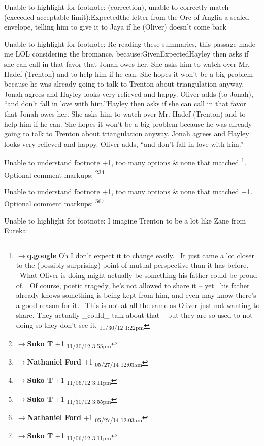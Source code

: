 	Unable to highlight for footnote: (correction), unable to correctly match (exceeded acceptable limit):Expectedthe letter from the Orc of Anglia  a sealed envelope, telling him to give it to Jaya if he (Oliver) doesn’t come back

	Unable to highlight for footnote: Re-reading these summaries, this passage made me LOL considering the bromance. because:GivenExpectedHayley then asks if she can call in that favor that Jonah owes her.  She asks him to watch over Mr. Hadef (Trenton) and to help him if he can.  She hopes it won’t be a big problem because he was already going to talk to Trenton about triangulation anyway.  Jonah agrees and Hayley looks very relieved and happy.  Oliver adds (to Jonah), “and don’t fall in love with him.”Hayley then asks if she can call in that favor that Jonah owes her.  She asks him to watch over Mr. Hadef (Trenton) and to help him if he can.  She hopes it won’t be a big problem because he was already going to talk to Trenton about triangulation anyway.  Jonah agrees and Hayley looks very relieved and happy.  Oliver adds, “and don’t fall in love with him.”

	Unable to understand footnote +1, too many options & none that matched \footnote{$\rightarrow$\textbf{q.google }Oh I don't expect it to change easily.  It just came a lot closer to the (possibly surprising) point of mutual perspective than it has before.  What Oliver is doing might actually be something his father could be proud of.  Of course, poetic tragedy, he's not allowed to share it -- yet  his father already knows something is being kept from him, and even may know there's a good reason for it.  This is not at all the same as Oliver just not wanting to share. They actually _could_ talk about that -- but they are so used to not doing so they don't see it. \textsubscript{11/30/12 1:22pm}}. Optional comment markups: \footnote{$\rightarrow$\textbf{Suko T }+1 \textsubscript{11/30/12 3:55pm}}\footnote{$\rightarrow$\textbf{Nathaniel Ford }+1 \textsubscript{05/27/14 12:03am}}\footnote{$\rightarrow$\textbf{Suko T }+1 \textsubscript{11/06/12 3:11pm}} 

	Unable to understand footnote +1, too many options & none that matched +1. Optional comment markups: \footnote{$\rightarrow$\textbf{Suko T }+1 \textsubscript{11/30/12 3:55pm}}\footnote{$\rightarrow$\textbf{Nathaniel Ford }+1 \textsubscript{05/27/14 12:03am}}\footnote{$\rightarrow$\textbf{Suko T }+1 \textsubscript{11/06/12 3:11pm}} 

	Unable to highlight for footnote: I imagine Trenton to be a lot like Zane from Eureka:

